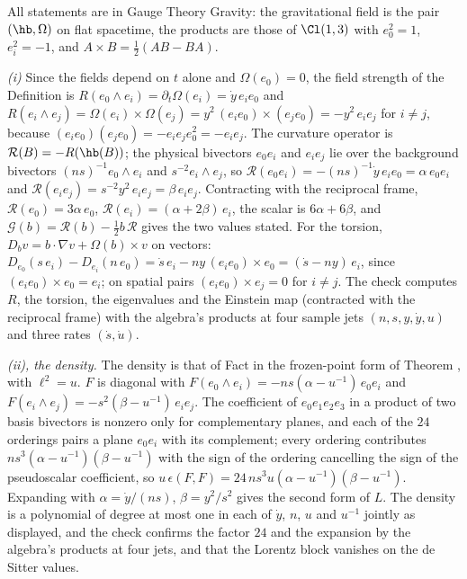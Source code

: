 All statements are in Gauge Theory Gravity: the gravitational field is the pair $(\hb, \Omega)$ on flat spacetime, the products are those of $\Cl(1,3)$ with $e_{0}^{2} = 1$, $e_{i}^{2} = -1$, and $A \times B = \tfrac12(AB - BA)$.

\emph{(i)} Since the fields depend on $t$ alone and $\Omega(e_{0}) = 0$, the field strength of the Definition is $R(e_{0} \wedge e_{i}) = \partial_{t}\Omega(e_{i}) = \dot y\,e_{i}e_{0}$ and $R(e_{i} \wedge e_{j}) = \Omega(e_{i}) \times \Omega(e_{j}) = y^{2}\,(e_{i}e_{0}) \times (e_{j}e_{0}) = -y^{2}\,e_{i}e_{j}$ for $i \neq j$, because $(e_{i}e_{0})(e_{j}e_{0}) = -e_{i}e_{j}e_{0}^{2} = -e_{i}e_{j}$. The curvature operator is $\mathcal{R}(B) = -R(\hb(B))$; the physical bivectors $e_{0}e_{i}$ and $e_{i}e_{j}$ lie over the background bivectors $(ns)^{-1}e_{0} \wedge e_{i}$ and $s^{-2}e_{i} \wedge e_{j}$, so $\mathcal{R}(e_{0}e_{i}) = -(ns)^{-1}\dot y\,e_{i}e_{0} = \alpha\,e_{0}e_{i}$ and $\mathcal{R}(e_{i}e_{j}) = s^{-2}y^{2}\,e_{i}e_{j} = \beta\,e_{i}e_{j}$. Contracting with the reciprocal frame, $\mathcal{R}(e_{0}) = 3\alpha\,e_{0}$, $\mathcal{R}(e_{i}) = (\alpha + 2\beta)\,e_{i}$, the scalar is $6\alpha + 6\beta$, and $\mathcal{G}(b) = \mathcal{R}(b) - \tfrac12 b\,\mathcal{R}$ gives the two values stated. For the torsion, $D_{b}v = b \cdot \nabla v + \Omega(b) \times v$ on vectors: $D_{e_{0}}(s\,e_{i}) - D_{e_{i}}(n\,e_{0}) = \dot s\,e_{i} - n y\,(e_{i}e_{0}) \times e_{0} = (\dot s - n y)\,e_{i}$, since $(e_{i}e_{0}) \times e_{0} = e_{i}$; on spatial pairs $(e_{i}e_{0}) \times e_{j} = 0$ for $i \neq j$. The check computes $R$, the torsion, the eigenvalues and the Einstein map (contracted with the reciprocal frame) with the algebra's products at four sample jets $(n, s, y, \dot y, u)$ and three rates $(\dot s, \dot u)$.

\emph{(ii), the density.} The density is that of Fact  in the frozen-point form of Theorem , with $\ell^{2} = u$. $F$ is diagonal with $F(e_{0} \wedge e_{i}) = -ns(\alpha - u^{-1})\,e_{0}e_{i}$ and $F(e_{i} \wedge e_{j}) = -s^{2}(\beta - u^{-1})\,e_{i}e_{j}$. The coefficient of $e_{0}e_{1}e_{2}e_{3}$ in a product of two basis bivectors is nonzero only for complementary planes, and each of the $24$ orderings pairs a plane $e_{0}e_{i}$ with its complement; every ordering contributes $n s^{3}(\alpha - u^{-1})(\beta - u^{-1})$ with the sign of the ordering cancelling the sign of the pseudoscalar coefficient, so $u\,\epsilon(F, F) = 24\,n s^{3}u(\alpha - u^{-1})(\beta - u^{-1})$. Expanding with $\alpha = \dot y/(ns)$, $\beta = y^{2}/s^{2}$ gives the second form of $L$. The density is a polynomial of degree at most one in each of $\dot y$, $n$, $u$ and $u^{-1}$ jointly as displayed, and the check confirms the factor $24$ and the expansion by the algebra's products at four jets, and that the Lorentz block vanishes on the de Sitter values.


